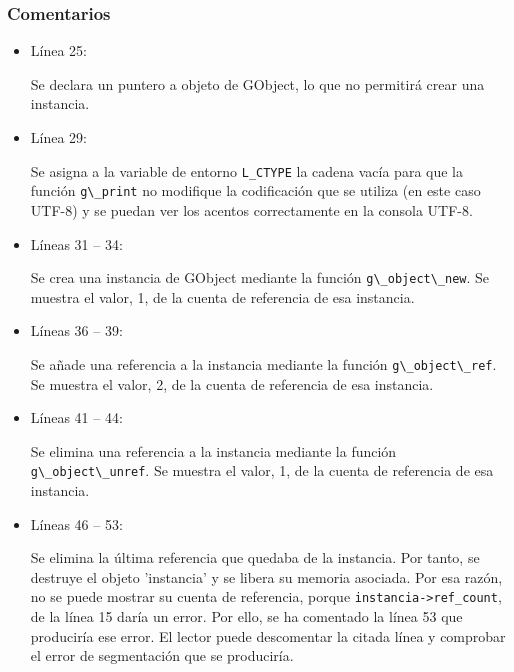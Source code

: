\subsubsection{Comentarios}
\begin{itemize}
\item Línea 25:\par
  Se declara un puntero a objeto de \textsf{GObject}, lo que no permitirá crear una instancia.
\item Línea 29:\par
  Se asigna a la variable de entorno \texttt{L\_CTYPE} la cadena vacía para que la función
  \passthrough{\lstinline!g\_print!} no modifique la codificación que se utiliza (en este caso UTF-8)
  y se puedan ver los acentos correctamente en la consola UTF-8.
\item Líneas 31 -- 34:\par
  Se crea una instancia de \textsf{GObject} mediante la función \passthrough{\lstinline!g\_object\_new!}.
  Se muestra el valor, 1,  de la cuenta de referencia de esa instancia.
\item Líneas 36 -- 39:\par
  Se añade una referencia a la instancia mediante la función  \passthrough{\lstinline!g\_object\_ref!}.
  Se muestra el valor, 2,  de la cuenta de referencia de esa instancia.
\item Líneas 41 -- 44:\par
  Se elimina una referencia a la instancia mediante la función  \passthrough{\lstinline!g\_object\_unref!}.
  Se muestra el valor, 1,  de la cuenta de referencia de esa instancia.
\item Líneas 46 -- 53:\par
  Se elimina la  última referencia que quedaba de la instancia.
  Por tanto, se destruye el objeto 'instancia' y se libera su memoria asociada.
  Por esa razón, no se puede mostrar su cuenta de referencia, porque
  \passthrough{\lstinline!instancia->ref_count!}, de la línea 15 daría un error.
  Por ello, se ha comentado la línea 53 que produciría ese error.
  El lector puede descomentar la citada línea y comprobar el error de segmentación que se produciría.
  \end{itemize}












